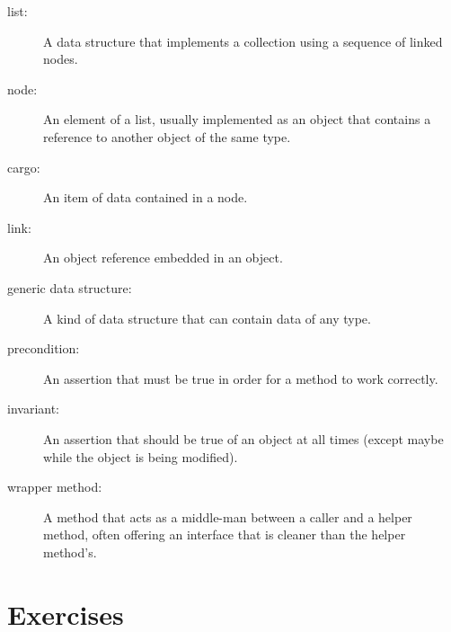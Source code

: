 \documentclass[12pt]{book}
\theoremstyle{exercise}
\begin{document}
\begin{description}

\item[list:] A data structure that implements a collection using
a sequence of linked nodes.

\item[node:] An element of a list, usually implemented as an object
that contains a reference to another object of the same type.

\item[cargo:] An item of data contained in a node. 

\item[link:] An object reference embedded in an object.

\item[generic data structure:] A kind of data structure that can contain data
of any type.

\item[precondition:] An assertion that must be true in order for a
method to work correctly.

\item[invariant:] An assertion that should be true of an object at
all times (except maybe while the object is being modified).

\item[wrapper method:] A method that acts as a middle-man between a
caller and a helper method, often offering an interface that is
cleaner than the helper method's.

\end{description}


\section{Exercises}
\end{document}
